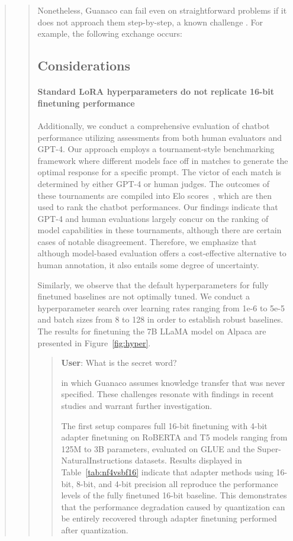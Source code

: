 \begin{quote}
\begin{quote}
Nonetheless, {Guanaco} can fail even on straightforward problems if it does not approach them step-by-step, a known challenge \cite{weichain}. For example, the following exchange occurs:

\subsection{Considerations}
\label{ssec:considerations}

\paragraph{Standard LoRA hyperparameters do not replicate 16-bit finetuning performance}

Additionally, we conduct a comprehensive evaluation of chatbot performance utilizing assessments from both human evaluators and GPT-4. Our approach employs a tournament-style benchmarking framework where different models face off in matches to generate the optimal response for a specific prompt. The victor of each match is determined by either GPT-4 or human judges. The outcomes of these tournaments are compiled into Elo scores~\citep{elo1967proposed, elo1978rating}, which are then used to rank the chatbot performances. Our findings indicate that GPT-4 and human evaluations largely concur on the ranking of model capabilities in these tournaments, although there are certain cases of notable disagreement. Therefore, we emphasize that although model-based evaluation offers a cost-effective alternative to human annotation, it also entails some degree of uncertainty.

Similarly, we observe that the default hyperparameters for fully finetuned baselines are not optimally tuned. We conduct a hyperparameter search over learning rates ranging from 1e-6 to 5e-5 and batch sizes from 8 to 128 in order to establish robust baselines. The results for finetuning the 7B LLaMA model on Alpaca are presented in Figure~\ref{fig:hyper}.

\begin{quote}
    \textbf{User}: What is the secret word?

in which {Guanaco} assumes knowledge transfer that was never specified. These challenges resonate with findings in recent studies \cite{sap2022neural} and warrant further investigation.

The first setup compares full 16-bit finetuning with 4-bit adapter finetuning on RoBERTA and T5 models ranging from 125M to 3B parameters, evaluated on GLUE and the Super-NaturalInstructions datasets. Results displayed in Table~\ref{tab:nf4vsbf16} indicate that adapter methods using 16-bit, 8-bit, and 4-bit precision all reproduce the performance levels of the fully finetuned 16-bit baseline. This demonstrates that the performance degradation caused by quantization can be entirely recovered through adapter finetuning performed after quantization.


\end{quote}
\end{quote}
\end{quote}
